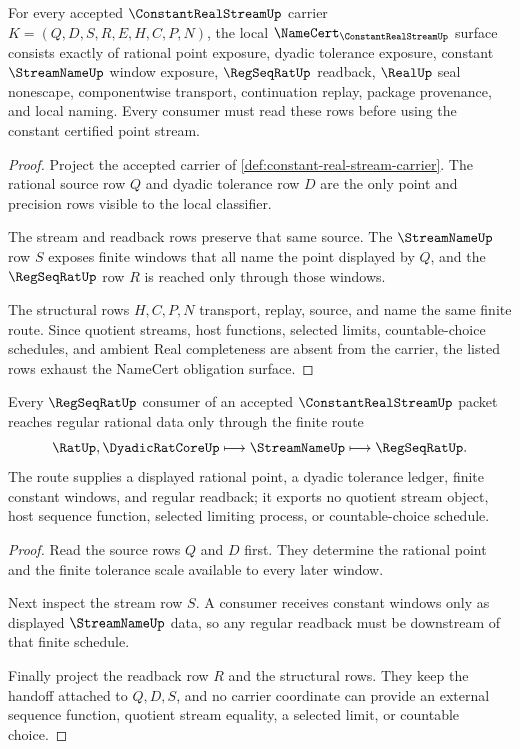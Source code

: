 \begin{theorem}
\label{thm:constant-real-stream-obligations}
For every accepted $\ConstantRealStreamUp$ carrier $K=(Q,D,S,R,E,H,C,P,N)$, the local $\NameCert_{\ConstantRealStreamUp}$ surface consists exactly of rational point exposure, dyadic tolerance exposure, constant $\StreamNameUp$ window exposure, $\RegSeqRatUp$ readback, $\RealUp$ seal nonescape, componentwise transport, continuation replay, package provenance, and local naming. Every consumer must read these rows before using the constant certified point stream.
\end{theorem}
\begin{proof}
Project the accepted carrier of \autoref{def:constant-real-stream-carrier}. The rational source row $Q$ and dyadic tolerance row $D$ are the only point and precision rows visible to the local classifier.

The stream and readback rows preserve that same source. The $\StreamNameUp$ row $S$ exposes finite windows that all name the point displayed by $Q$, and the $\RegSeqRatUp$ row $R$ is reached only through those windows.

The structural rows $H,C,P,N$ transport, replay, source, and name the same finite route. Since quotient streams, host functions, selected limits, countable-choice schedules, and ambient Real completeness are absent from the carrier, the listed rows exhaust the NameCert obligation surface.
\end{proof}

\begin{theorem}
\label{thm:constant-real-stream-regseqrat-route}
Every $\RegSeqRatUp$ consumer of an accepted $\ConstantRealStreamUp$ packet reaches regular rational data only through the finite route
$$
\RatUp,\DyadicRatCoreUp
\longmapsto
\StreamNameUp
\longmapsto
\RegSeqRatUp .
$$
The route supplies a displayed rational point, a dyadic tolerance ledger, finite constant windows, and regular readback; it exports no quotient stream object, host sequence function, selected limiting process, or countable-choice schedule.
\end{theorem}
\begin{proof}
Read the source rows $Q$ and $D$ first. They determine the rational point and the finite tolerance scale available to every later window.

Next inspect the stream row $S$. A consumer receives constant windows only as displayed $\StreamNameUp$ data, so any regular readback must be downstream of that finite schedule.

Finally project the readback row $R$ and the structural rows. They keep the handoff attached to $Q,D,S$, and no carrier coordinate can provide an external sequence function, quotient stream equality, a selected limit, or countable choice.
\end{proof}

